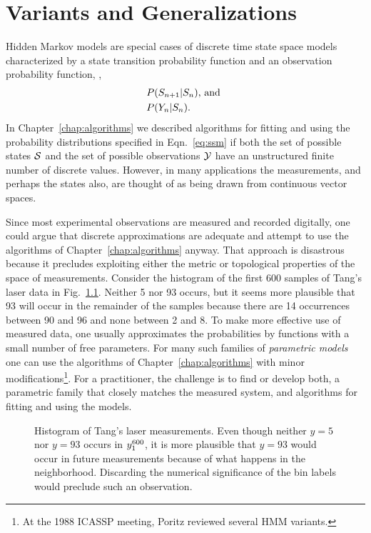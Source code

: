 \chapter{Variants and Generalizations}
\label{chap:variants}

Hidden Markov models are special cases of discrete time state space
models characterized by a state transition probability function and an
observation probability function, \ie,
\begin{subequations}
  \label{eq:ssm}
  \begin{align}
      &P(S_{n+1}|S_n)\text{, and }\\
      &P(Y_n|S_n).
  \end{align}
\end{subequations}
In Chapter~\ref{chap:algorithms} we described algorithms for fitting
and using the probability distributions specified in
Eqn.~\eqref{eq:ssm} if both the set of possible states $\states$ and
the set of possible observations $\outputs$ have an unstructured
finite number of discrete values.  However, in many applications the
measurements, and perhaps the states also, are thought of as being
drawn from continuous vector spaces.

Since most experimental observations are measured and recorded
digitally, one could argue that discrete approximations are adequate
and attempt to use the algorithms of Chapter~\ref{chap:algorithms}
anyway.  That approach is disastrous because it precludes exploiting
either the metric or topological properties of the space of
measurements.  Consider the histogram of the first 600 samples of
Tang's laser data in Fig.~\ref{fig:LaserHist}.  Neither 5 nor 93
occurs, but it seems more plausible that 93 will occur in the
remainder of the samples because there are 14 occurrences between 90
and 96 and none between 2 and 8.  To make more effective use of
measured data, one usually approximates the probabilities by functions
with a small number of free parameters.  For many such families of
\emph{parametric models} one can use the algorithms of
Chapter~\ref{chap:algorithms} with minor modifications\footnote{At the
  1988 ICASSP meeting, Poritz\cite{Poritz88} reviewed several HMM
  variants.}.  For a practitioner, the challenge is to find or develop
both, a parametric family that closely matches the measured system,
and algorithms for fitting and using the models.

\begin{figure}[htbp]
  \caption[Histogram of Tang's laser measurements.]%
  {Histogram of Tang's laser measurements.  Even though neither $y=5$
    nor $y=93$ occurs in $y_{1}^{600}$, it is more plausible that
    $y=93$ would occur in future measurements because of what happens
    in the neighborhood.  Discarding the numerical significance of the
    bin labels would preclude such an observation. }
  \label{fig:LaserHist}
\end{figure}

